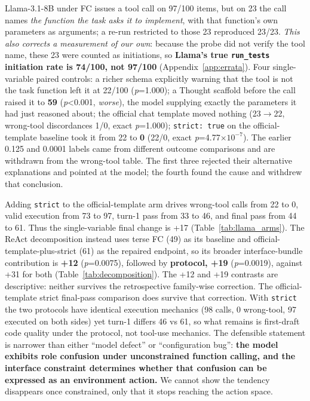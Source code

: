 Llama-3.1-8B under FC issues a tool call on 97/100 items, but on 23 the call names \emph{the
function the task asks it to implement}, with that function's own parameters as arguments; a re-run
restricted to those 23 reproduced 23/23. \emph{This also corrects a measurement of our own}:
because the probe did not verify the tool name, these 23 were counted as initiations, so
\textbf{Llama's true \texttt{run\_tests} initiation rate is 74/100, not 97/100}
(Appendix~\ref{app:errata}). Four single-variable paired controls: a richer schema explicitly
warning that the tool is not the task function left it at 22/100 (\emph{p}=1.000); a Thought
scaffold before the call raised it to \textbf{59} (\emph{p}\textless0.001, \emph{worse}), the model
supplying exactly the parameters it had just reasoned about; the official chat template moved
nothing (23$\to$22, wrong-tool discordances 1/0, exact \emph{p}=1.000); \texttt{strict: true}
on the official-template baseline took it from 22 to \textbf{0} (22/0, exact
\emph{p}=4.77$\times10^{-7}$). The earlier 0.125 and 0.0001 labels came from different outcome
comparisons and are withdrawn from the wrong-tool table. The first three rejected their alternative explanations and pointed at the
model; the fourth found the cause and withdrew that conclusion.

Adding \texttt{strict} to the official-template arm drives wrong-tool calls from 22 to 0, valid
execution from 73 to 97, turn-1 pass from 33 to 46, and final pass from 44 to 61. Thus the
single-variable final change is +17 (Table~\ref{tab:llama_arms}). The ReAct decomposition instead
uses terse FC (49) as its baseline and official-template-plus-strict (61) as the repaired endpoint,
so its broader interface-bundle contribution is \textbf{+12} (\emph{p}=0.0075), followed by
\textbf{protocol, +19}
(\emph{p}=0.0019), against +31 for both (Table~\ref{tab:decomposition}). The +12 and +19
contrasts are descriptive: neither survives the retrospective family-wise correction.
The official-template strict final-pass comparison does survive that correction. With \texttt{strict} the two
protocols have identical execution mechanics (98 calls, 0 wrong-tool, 97 executed on both sides)
yet turn-1 differs 46 vs 61, so what remains is first-draft code quality under the protocol, not
tool-use mechanics. The defensible statement is narrower than either ``model defect'' or
``configuration bug'': \textbf{the model exhibits role confusion under unconstrained function
calling, and the interface constraint determines whether that confusion can be expressed as an
environment action.} We cannot show the tendency disappears once constrained, only that it stops
reaching the action space.

